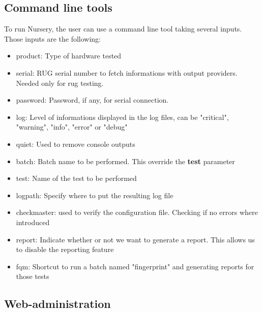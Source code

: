 \documentclass[12pt]{article}
\theoremstyle{definition}
\theoremstyle{definition}
\theoremstyle{remark}
\begin{document}
\subsection{Command line tools}

To run Nursery, the user can use a command line tool taking several inputs. Those inputs are the following:

\begin{itemize}
\item product: Type of hardware tested
\item serial: RUG serial number to fetch informations with output providers. Needed only for \gls{rug} testing.
\item password: Password, if any, for serial connection.
\item log: Level of informations displayed in the log files, can be "critical", "warning", "info", "error" or "debug"
\item quiet: Used to remove console outputs
\item batch: Batch name to be performed. This override the \textbf{test} parameter
\item test: Name of the test to be performed
\item logpath: Specify where to put the resulting log file
\item checkmaster: used to verify the configuration file. Checking if no errors where introduced
\item report: Indicate whether or not we want to generate a report. This allows us to disable the reporting feature
\item fqm: Shortcut to run a batch named "fingerprint" and generating reports for those tests
\end{itemize}


\subsection{Web-administration}
\end{document}
